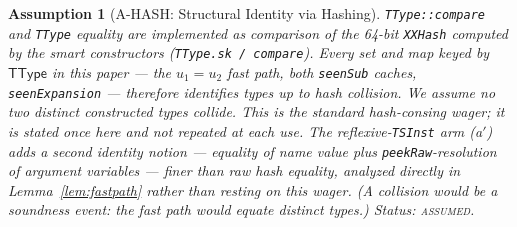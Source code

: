 \documentclass[11pt]{article}
\newtheorem{assumption}[theorem]{Assumption}
\newcommand{\TType}{\mathsf{TType}}
\begin{document}
\begin{assumption}[A-HASH: Structural Identity via Hashing]
\label{as:hash}
\texttt{TType::compare} and \texttt{TType} equality are implemented as
comparison of the 64-bit \texttt{XXHash} computed by the smart
constructors (\texttt{TType.sk / compare}). Every set and map keyed by
$\TType$ in this paper --- the $u_1 = u_2$ fast path, both
\texttt{seenSub} caches, \texttt{seenExpansion} --- therefore identifies
types up to hash collision. We assume no two distinct constructed types
collide. This is the standard hash-consing wager; it is stated once here
and not repeated at each use. The reflexive-\texttt{TSInst} arm (a$'$) adds
a second identity notion --- equality of name \emph{value} plus
\texttt{peekRaw}-resolution of argument variables --- finer than raw hash
equality, analyzed directly in Lemma~\ref{lem:fastpath} rather than
resting on this wager. (A collision would be a \emph{soundness}
event: the fast path would equate distinct types.) Status:
\textsc{assumed}.
\end{assumption}
\end{document}
